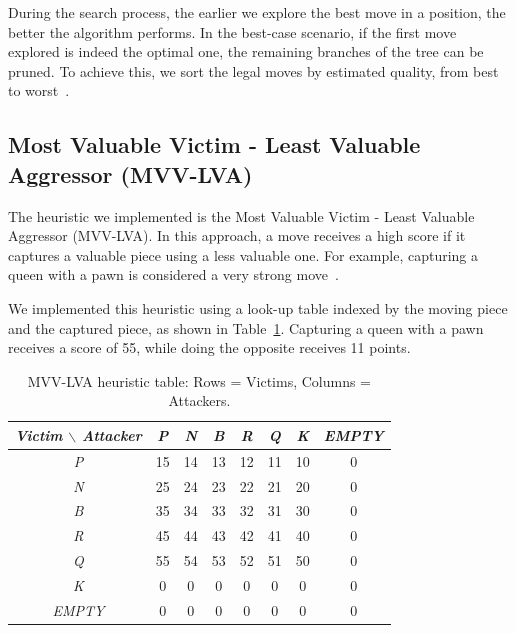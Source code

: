 \noindent During the search process, the earlier we explore the best move in a position, the better the algorithm performs. In the best-case scenario, if the first move explored is indeed the optimal one, the remaining branches of the tree can be pruned. To achieve this, we sort the legal moves by estimated quality, from best to worst~\cite{MoveOrdering}.

\subsection*{Most Valuable Victim - Least Valuable Aggressor (MVV-LVA)}

\noindent The heuristic we implemented is the Most Valuable Victim - Least Valuable Aggressor (MVV-LVA). In this approach, a move receives a high score if it captures a valuable piece using a less valuable one. For example, capturing a queen with a pawn is considered a very strong move~\cite{MVVLVA}.

\vspace{1em}

\noindent We implemented this heuristic using a look-up table indexed by the moving piece and the captured piece, as shown in Table~\ref{tab:mvv-lva-table}. Capturing a queen with a pawn receives a score of 55, while doing the opposite receives 11 points.

\begin{table}[H]
    \centering
    \begin{tabular}{|c|c|c|c|c|c|c|c|}
    \hline
    \textit{Victim $\backslash$ Attacker} & \textit{P} & \textit{N} & \textit{B} & \textit{R} & \textit{Q} & \textit{K} & \textit{EMPTY} \\
    \hline
    \textit{P}     & 15 & 14 & 13 & 12 & 11 & 10 & 0 \\
    \textit{N}     & 25 & 24 & 23 & 22 & 21 & 20 & 0 \\
    \textit{B}     & 35 & 34 & 33 & 32 & 31 & 30 & 0 \\
    \textit{R}     & 45 & 44 & 43 & 42 & 41 & 40 & 0 \\
    \textit{Q}     & 55 & 54 & 53 & 52 & 51 & 50 & 0 \\
    \textit{K}     &  0 &  0 &  0 &  0 &  0 &  0 & 0 \\
    \textit{EMPTY} &  0 &  0 &  0 &  0 &  0 &  0 & 0 \\
    \hline
    \end{tabular}
    \caption{MVV-LVA heuristic table: Rows = Victims, Columns = Attackers.}
    \label{tab:mvv-lva-table}
\end{table}

